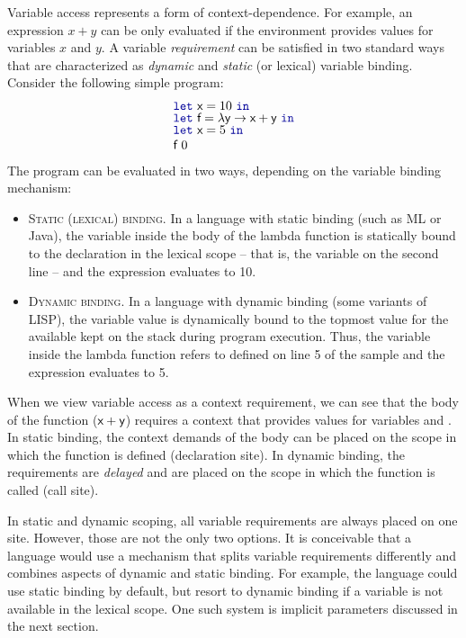 Variable access represents a form of context-dependence. For example, an expression $x+y$ can be
only evaluated if the environment provides values for variables $x$ and $y$. A variable
\emph{requirement} can be satisfied in two standard ways that are characterized as \emph{dynamic}
and \emph{static} (or lexical) variable binding. Consider the following simple program:
%
\begin{equation*}
\begin{array}{l}
\kvd{let}~\ident{x}=10~\kvd{in}\\[-0.25em]
\kvd{let}~\ident{f}=\lambda \ident{y}\rightarrow \ident{x}+\ident{y}~\kvd{in}\\[-0.25em]
\kvd{let}~\ident{x}=5~\kvd{in}\\
\ident{f}~0
\end{array}
\end{equation*}
%
The program can be evaluated in two ways, depending on the variable binding mechanism:
%
\begin{itemize}
\item \textsc{Static (lexical) binding.} In a language with static binding (such as ML or Java),
  the variable  inside the body of the lambda function is statically bound to the
  declaration in the lexical scope -- that is, the variable on the second line -- and the
  expression evaluates to 10.

\item \textsc{Dynamic binding.} In a language with dynamic binding (some variants of LISP), the
  variable value is dynamically bound to the topmost value for the available kept on the stack 
  during program execution. Thus, the  variable inside the lambda function refers to
   defined on line 5 of the sample and the expression evaluates to 5.
\end{itemize}

\noindent
When we view variable access as a context requirement, we can see that the body of the function
($\ident{x}+\ident{y}$) requires a context that provides values for variables  and
. In static binding, the context demands of the body can be placed on the scope in
which the function is defined (declaration site). In dynamic binding, the requirements are
\emph{delayed} and are placed on the scope in which the function is called (call site).

In static and dynamic scoping, all variable requirements are always placed on one site. However,
those are not the only two options. It is conceivable that a language would use a mechanism that
splits variable requirements differently and combines aspects of dynamic and static binding. For
example, the language could use static binding by default, but resort to dynamic binding if a
variable is not available in the lexical scope. One such system is implicit parameters
discussed in the next section.

